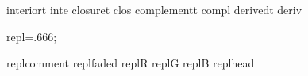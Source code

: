 \def\derived#1{#1'}
\def\interior#1{#1^\smile}
\def\closure#1{#1^\frown}
\let\deri=\derived
\let\inte=\interior
\let\clos=\closure
\let\cmpl=\compl
\DefOP interiort   inte
\DefOP closuret    clos
\DefOP complementt compl
\DefOP derivedt    deriv
\def\topobyns#1{\cal O_{#1}}%
\def\hoodsofp#1#2{{#1}\funparen{#2}}%
\def\toposep#1{{\ensuremath{\mathrm T_{#1}}}}
\def\subtopo{\leq}
\def\hoodscross{\otimes}
\def\topocross{\times}


\Newskip repl=.666\bigskipamount;

\DefStyle replcomment {\color{faded}}
\DefStyle replfaded {\color{faded}}
\DefStyle replR {\aRstyle}
\DefStyle replG {\aGstyle}
\DefStyle replB {\aBstyle}
\DefStyle replhead {\sfbf}

\def\replalertstyle{\ifreplignorealerts\else\alertstyle\fi}

\newcount\repllineno
\newif\ifrepllabline
\newif\ifreplhidelineno
\newif\ifreplmath
\newif\ifreplalert
\newif\ifreplcross
\newif\ifreplmeaning
\newif\ifreplcomputation
\newif\ifreplcontinuation
\newif\ifreplskipcount
\newif\ifreplignorealerts
\newif\ifreplphantom
\newif\ifreplhide


\def\replhandleopts#1{%
\def\thisrepllinestyles{}%
\WhenStrContains{#1}{-}{\addto\thisrepllinestyles{\replcommentstyle}}%
\WhenStrContains{#1}{a}{\replalerttrue\addto\thisrepllinestyles{\replalertstyle}}%
\WhenStrContains{#1}{f}{\addto\thisrepllinestyles{\replfadedstyle}}%
\WhenStrContains{#1}{R}{\addto\thisrepllinestyles{\replRstyle}}%
\WhenStrContains{#1}{G}{\addto\thisrepllinestyles{\replGstyle}}%
\WhenStrContains{#1}{B}{\addto\thisrepllinestyles{\replBstyle}}%
\WhenStrContains{#1}{c}{\replcomputationtrue}%
\WhenStrContains{#1}{,}{\replcontinuationtrue}%
\WhenStrContains{#1}{t}{\addto\thisrepllinestyles{\replmathfalse}}%
\WhenStrContains{#1}{m}{\addto\thisrepllinestyles{\replmathtrue}}%
\WhenStrContains{#1}{/}{\addto\thisrepllinestyles{\replcrosstrue}}%
\WhenStrContains{#1}{=}{\addto\thisrepllinestyles{\replmeaningtrue}}%
\WhenStrContains{#1}{x}{\replphantomtrue}%
\WhenStrContains{#1}{X}{\replhidetrue}%
}

